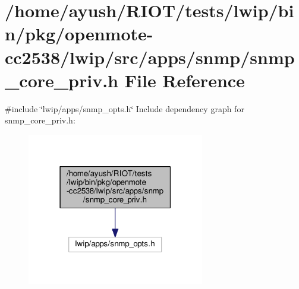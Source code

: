 \hypertarget{openmote-cc2538_2lwip_2src_2apps_2snmp_2snmp__core__priv_8h}{}\section{/home/ayush/\+R\+I\+O\+T/tests/lwip/bin/pkg/openmote-\/cc2538/lwip/src/apps/snmp/snmp\+\_\+core\+\_\+priv.h File Reference}
\label{openmote-cc2538_2lwip_2src_2apps_2snmp_2snmp__core__priv_8h}
{\ttfamily \#include \char`\"{}lwip/apps/snmp\+\_\+opts.\+h\char`\"{}}\newline
Include dependency graph for snmp\+\_\+core\+\_\+priv.\+h\+:
\nopagebreak
\begin{figure}[H]
\begin{center}
\leavevmode
\includegraphics[width=219pt]{openmote-cc2538_2lwip_2src_2apps_2snmp_2snmp__core__priv_8h__incl}
\end{center}
\end{figure}
